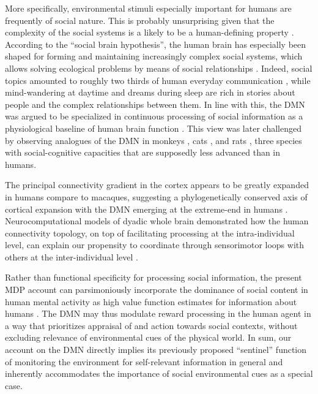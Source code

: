 \documentclass[10pt,letterpaper]{article}
\newcommand{\suggestadd}[1]{{\color{blue} #1}}
\begin{document}
More specifically,
environmental stimuli especially important for humans are frequently of
social nature. This is probably unsurprising
given that
the complexity of the social systems
is a likely to be a human-defining property
\citep{tomasello2009cultural}.
According to the ``social brain hypothesis'',
the human brain has especially been shaped for
forming and maintaining increasingly complex
social systems,
which allows solving ecological problems by means of social relationships
\citep{whiten1988machiavellian}.
Indeed, social topics amounted to roughly
two thirds of human everyday communication \citep{dunbar1997human},
while
mind-wandering at daytime and dreams during sleep
are rich in stories about people and
the complex relationships between them.
%
In line with this, the DMN was argued to be specialized in
continuous processing of social information as a
physiological baseline of human brain function
\citep{schilbach2008minds}. This view was later challenged by observing
analogues of the DMN in monkeys \citep{mantini2011default},
cats \citep{popa2009contrasting},
and rats \citep{lu2012rat}, three species with
social-cognitive capacities that are supposedly less advanced than in humans.

\suggestadd{The principal connectivity gradient in the cortex appears to be greatly expanded in humans compare to macaques, suggesting a phylogenetically conserved axis of cortical expansion with the DMN emerging at the extreme-end in humans \citep{margulies_situating_2016}. Neurocomputational models of dyadic whole brain demonstrated how the human connectivity topology, on top of facilitating processing at the intra-individual level, can explain our propensity to coordinate through sensorimotor loops with others at the inter-individual level \citep{dumas_anatomical_2012}.}

Rather than functional specificity for processing social information,
the present MDP account can parsimoniously incorporate
the dominance of social content in
human mental activity
as high value function estimates for information about humans
\citep{baker2009action, kampe2001psychology, krienen2010clan}.
The DMN may thus modulate reward processing
in the human agent in a way that prioritizes
appraisal of and action towards social contexts,
without excluding relevance of environmental cues of the physical world.
In sum,
our account on the DMN directly implies
its previously proposed ``sentinel'' function
of monitoring the environment for self-relevant information
in general and
inherently accommodates the importance of social environmental cues
as a special case.
\end{document}

